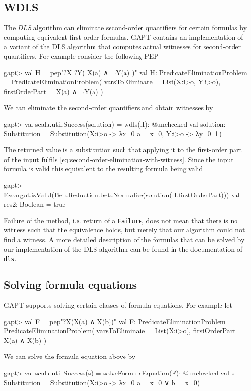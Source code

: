 \documentclass[a4paper,11pt]{book}
\begin{document}
\subsection{WDLS}

The \emph{DLS} algorithm \cite{Doherty1997Computing} can eliminate second-order quantifiers for certain formulas by computing equivalent first-order formulas.
GAPT contains an implementation of a variant of the DLS algorithm that computes actual witnesses for second-order quantifiers.
For example consider the following PEP
\begin{clilisting}
gapt> val H = pep"?X ?Y( X(a) ∧ ¬Y(a) )"
val H: PredicateEliminationProblem = PredicateEliminationProblem(
  varsToEliminate = List(X:i>o, Y:i>o),
  firstOrderPart = X(a) ∧ ¬Y(a)
)

\end{clilisting}
We can eliminate the second-order quantifiers and obtain witnesses by
\begin{clilisting}
gapt> val scala.util.Success(solution) = wdls(H): @unchecked
val solution: Substitution = Substitution(X:i>o -> λx_0 a = x_0, Y:i>o -> λy_0 ⊥)

\end{clilisting}
The returned value is a substitution such that applying it to the first-order part of the input fulfils \eqref{eq:second-order-elimination-with-witness}.
Since the input formula is valid this equivalent to the resulting formula being valid
\begin{clilisting}
gapt> Escargot.isValid(BetaReduction.betaNormalize(solution(H.firstOrderPart)))
val res2: Boolean = true

\end{clilisting}
Failure of the method, i.e. return of a \texttt{Failure}, does not mean that there is no witness such that the equivalence holds, but merely that our algorithm could not find a witness.
A more detailed description of the formulas that can be solved by our implementation of the DLS algorithm can be found in the documentation of \texttt{dls}.

\subsection{Solving formula equations}
GAPT supports solving certain classes of formula equations.
For example let
\begin{clilisting}
gapt> val F = pep"?X(X(a) ∧ X(b))"
val F: PredicateEliminationProblem = PredicateEliminationProblem(
  varsToEliminate = List(X:i>o),
  firstOrderPart = X(a) ∧ X(b)
)

\end{clilisting}
We can solve the formula equation above by
\begin{clilisting}
gapt> val scala.util.Success(s) = solveFormulaEquation(F): @unchecked
val s: Substitution = Substitution(X:i>o -> λx_0 a = x_0 ∨ b = x_0)

\end{clilisting}
\end{document}
